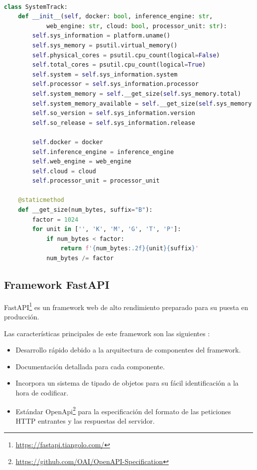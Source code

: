 \begin{lstlisting}[caption=Clase Python para generar información sobre el sistema.,
      label=d_label,
      language=Python,label={example4}]

class SystemTrack:
    def __init__(self, docker: bool, inference_engine: str,
            web_engine: str, cloud: bool, processor_unit: str):
        self.sys_information = platform.uname()
        self.sys_memory = psutil.virtual_memory()
        self.physical_cores = psutil.cpu_count(logical=False)
        self.total_cores = psutil.cpu_count(logical=True)
        self.system = self.sys_information.system
        self.processor = self.sys_information.processor
        self.system_memory = self.__get_size(self.sys_memory.total)
        self.system_memory_available = self.__get_size(self.sys_memory.available)
        self.so_version = self.sys_information.version
        self.so_release = self.sys_information.release

        self.docker = docker
        self.inference_engine = inference_engine
        self.web_engine = web_engine
        self.cloud = cloud
        self.processor_unit = processor_unit

    @staticmethod
    def __get_size(num_bytes, suffix="B"):
        factor = 1024
        for unit in ['', 'K', 'M', 'G', 'T', 'P']:
            if num_bytes < factor:
                return f'{num_bytes:.2f}{unit}{suffix}'
            num_bytes /= factor
\end{lstlisting}


\subsection{Framework FastAPI}\label{subsec:framework-fastapi}
FastAPI\footnote{\url{https://fastapi.tiangolo.com/}} es un framework web de alto rendimiento preparado para su puesta en producción.

Las características principales de este framework son las siguientes :

\begin{itemize}
    \item Desarrollo rápido debido a la arquitectura de componentes del framework.
    \item Documentación detallada para cada componente.
    \item Incorpora un sistema de tipado de objetos para su fácil identificación a la hora de codificar.
    \item Estándar OpenApi\footnote{\url{https://github.com/OAI/OpenAPI-Specification}} para la especificación del formato de las peticiones HTTP entrantes y las respuestas del servidor.
\end{itemize}




